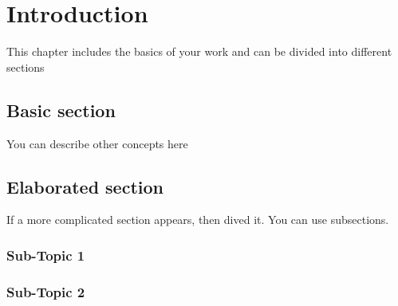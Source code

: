 %
 
 
\chapter{Introduction}

This chapter includes the basics of your work
and can be divided into different sections

\section{Basic section}
You can describe other concepts here

\section{Elaborated section}
If a more complicated section appears, then dived it.
You can use subsections.

\subsection{Sub-Topic 1}

\subsection{Sub-Topic 2}
